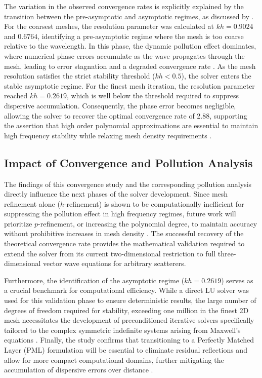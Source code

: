 \documentclass[class=report, crop=false]{standalone}
\begin{document}
The variation in the observed convergence rates is explicitly explained by the transition between the pre-asymptotic and asymptotic regimes, as discussed by \citet{Melenk2024}. For the coarsest meshes, the resolution parameter was calculated at $kh = 0.9024$ and $0.6764$, identifying a pre-asymptotic regime where the mesh is too coarse relative to the wavelength. In this phase, the dynamic pollution effect dominates, where numerical phase errors accumulate as the wave propagates through the mesh, leading to error stagnation and a degraded convergence rate \citep{Babuska1997}. As the mesh resolution satisfies the strict stability threshold ($kh < 0.5$), the solver enters the stable asymptotic regime. For the finest mesh iteration, the resolution parameter reached $kh = 0.2619$, which is well below the threshold required to suppress dispersive accumulation. Consequently, the phase error becomes negligible, allowing the solver to recover the optimal convergence rate of 2.88, supporting the assertion that high order polynomial approximations are essential to maintain high frequency stability while relaxing mesh density requirements \citep{Frelet2024}.

\subsection{Impact of Convergence and Pollution Analysis}

The findings of this convergence study and the corresponding pollution analysis directly influence the next phases of the solver development. Since mesh refinement alone ($h$-refinement) is shown to be computationally inefficient for suppressing the pollution effect in high frequency regimes, future work will prioritize $p$-refinement, or increasing the polynomial degree, to maintain accuracy without prohibitive increases in mesh density \citep{Melenk2024}. The successful recovery of the theoretical convergence rate provides the mathematical validation required to extend the solver from its current two-dimensional restriction to full three-dimensional vector wave equations for arbitrary scatterers.

Furthermore, the identification of the asymptotic regime ($kh = 0.2619$) serves as a crucial benchmark for computational efficiency. While a direct LU solver was used for this validation phase to ensure deterministic results, the large number of degrees of freedom required for stability, exceeding one million in the finest 2D mesh necessitates the development of preconditioned iterative solvers specifically tailored to the complex symmetric indefinite systems arising from Maxwell's equations \citep{Owusu-Agyemang2025}. Finally, the study confirms that transitioning to a Perfectly Matched Layer (PML) formulation will be essential to eliminate residual reflections and allow for more compact computational domains, further mitigating the accumulation of dispersive errors over distance \citep{Berenger1994}.
\end{document}
